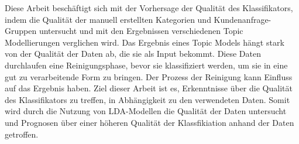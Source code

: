 \documentclass[german,version-2020-11]{uzl-thesis}
\begin{document}
Diese Arbeit beschäftigt sich mit der Vorhersage der Qualität des Klassifikators, indem die Qualität der manuell erstellten Kategorien und Kundenanfrage-Gruppen untersucht und mit den Ergebnissen verschiedenen Topic Modellierungen verglichen wird. Das Ergebnis eines Topic Models hängt stark von der Qualität der Daten ab, die sie als Input bekommt. Diese Daten durchlaufen eine Reinigungsphase, bevor sie klassifiziert werden, um sie in eine gut zu verarbeitende Form zu bringen. Der Prozess der Reinigung kann Einfluss auf das Ergebnis haben. Ziel dieser Arbeit ist es, Erkenntnisse über die Qualität des Klassifikators zu treffen, in Abhängigkeit zu den verwendeten Daten. Somit wird durch die Nutzung von LDA-Modellen die Qualität der Daten untersucht und Prognosen über einer höheren Qualität der Klassfikiation anhand der Daten getroffen. 
\end{document}
